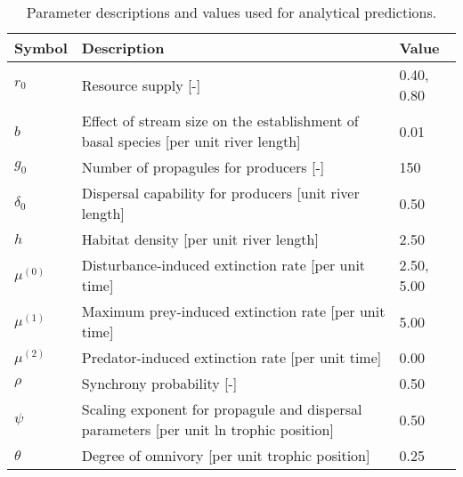 \begin{table}[ht]
\centering
\caption{Parameter descriptions and values used for analytical predictions.} 
\label{tab:parms}
\begingroup\small
\begin{tabularx}{\textwidth}{lll}
  \hline
Symbol & Description & Value \\ 
  \hline
$r_0$ & Resource supply [-] & 0.40, 0.80 \\ 
  $b$ & Effect of stream size on the establishment of basal species [per unit river length] & 0.01 \\ 
  $g_0$ & Number of propagules for producers [-] & 150 \\ 
  $\delta_0$ & Dispersal capability for producers [unit river length] & 0.50 \\ 
  $h$ & Habitat density [per unit river length] & 2.50 \\ 
  $\mu^{(0)}$ & Disturbance-induced extinction rate [per unit time] & 2.50, 5.00 \\ 
  $\mu^{(1)}$ & Maximum prey-induced extinction rate [per unit time] & 5.00 \\ 
  $\mu^{(2)}$ & Predator-induced extinction rate [per unit time] & 0.00 \\ 
  $\rho$ & Synchrony probability [-] & 0.50 \\ 
  $\psi$ & Scaling exponent for propagule and dispersal parameters [per unit ln trophic position] & 0.50 \\ 
  $\theta$ & Degree of omnivory [per unit trophic position] & 0.25 \\ 
   \hline
\end{tabularx}
\endgroup
\end{table}
